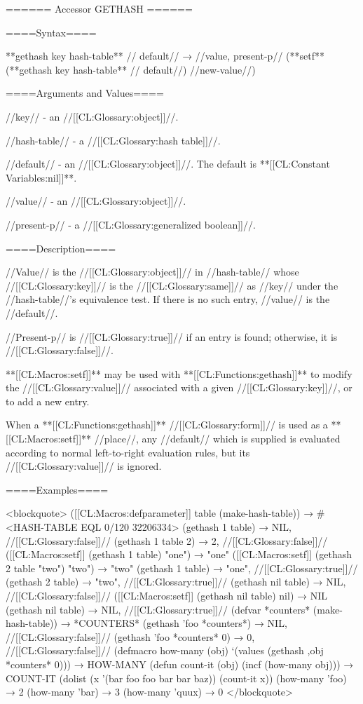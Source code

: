 ====== Accessor GETHASH ======

====Syntax====

**gethash {key hash-table** //\opt} default// → //value, present-p// (**setf** (**gethash {key hash-table** //\opt} default//) //new-value//)

====Arguments and Values====

//key// - an //[[CL:Glossary:object]]//.

//hash-table// - a //[[CL:Glossary:hash table]]//.

//default// - an //[[CL:Glossary:object]]//. The default is **[[CL:Constant Variables:nil]]**.

//value// - an //[[CL:Glossary:object]]//.

//present-p// - a //[[CL:Glossary:generalized boolean]]//.

====Description====

//Value// is the //[[CL:Glossary:object]]// in //hash-table// whose //[[CL:Glossary:key]]// is the //[[CL:Glossary:same]]// as //key// under the //hash-table//'s equivalence test. If there is no such entry, //value// is the //default//.

//Present-p// is //[[CL:Glossary:true]]// if an entry is found; otherwise, it is //[[CL:Glossary:false]]//.

**[[CL:Macros:setf]]** may be used with **[[CL:Functions:gethash]]** to modify the //[[CL:Glossary:value]]// associated with a given //[[CL:Glossary:key]]//, or to add a new entry.

When a **[[CL:Functions:gethash]]** //[[CL:Glossary:form]]// is used as a **[[CL:Macros:setf]]** //place//, any //default// which is supplied is evaluated according to normal left-to-right evaluation rules, but its //[[CL:Glossary:value]]// is ignored.

====Examples====

<blockquote> ([[CL:Macros:defparameter]] table (make-hash-table)) → #<HASH-TABLE EQL 0/120 32206334> (gethash 1 table) → NIL, //[[CL:Glossary:false]]// (gethash 1 table 2) → 2, //[[CL:Glossary:false]]// ([[CL:Macros:setf]] (gethash 1 table) "one") → "one" ([[CL:Macros:setf]] (gethash 2 table "two") "two") → "two" (gethash 1 table) → "one", //[[CL:Glossary:true]]// (gethash 2 table) → "two", //[[CL:Glossary:true]]// (gethash nil table) → NIL, //[[CL:Glossary:false]]// ([[CL:Macros:setf]] (gethash nil table) nil) → NIL (gethash nil table) → NIL, //[[CL:Glossary:true]]// (defvar *counters* (make-hash-table)) → *COUNTERS* (gethash 'foo *counters*) → NIL, //[[CL:Glossary:false]]// (gethash 'foo *counters* 0) → 0, //[[CL:Glossary:false]]// (defmacro how-many (obj) `(values (gethash ,obj *counters* 0))) → HOW-MANY (defun count-it (obj) (incf (how-many obj))) → COUNT-IT (dolist (x '(bar foo foo bar bar baz)) (count-it x)) (how-many 'foo) → 2 (how-many 'bar) → 3 (how-many 'quux) → 0 </blockquote>

